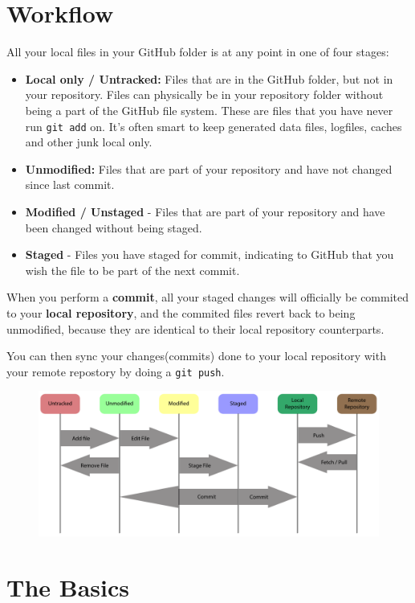 \documentclass[12p,a4paper]{article}
\begin{document}
\section{Workflow}
All your local files in your GitHub folder is at any point in one of four stages:
\begin{itemize}
\item \textbf{Local only / Untracked:} Files that are in the GitHub folder, but not in your repository. Files can physically be in your repository folder without being a part of the GitHub file system. These are files that you have never run \texttt{git add} on. It's often smart to keep generated data files, logfiles, caches and other junk local only.
\item \textbf{Unmodified:} Files that are part of your repository and have not changed since last commit.
\item \textbf{Modified / Unstaged} - Files that are part of your repository and have been changed without being staged.
\item \textbf{Staged} - Files you have staged for commit, indicating to GitHub that you wish the file to be part of the next commit.
\end{itemize}

When you perform a \textbf{commit}, all your staged changes will officially be commited to your \textbf{local repository}, and the commited files revert back to being unmodified, because they are identical to their local repository counterparts.

You can then sync your changes(commits) done to your local repository with your remote repostory by doing a \texttt{git push}.

\begin{figure}[H]
\centering
\includegraphics[width=\textwidth]{github.pdf}
\end{figure}



\newpage
\section{The Basics}
\end{document}
